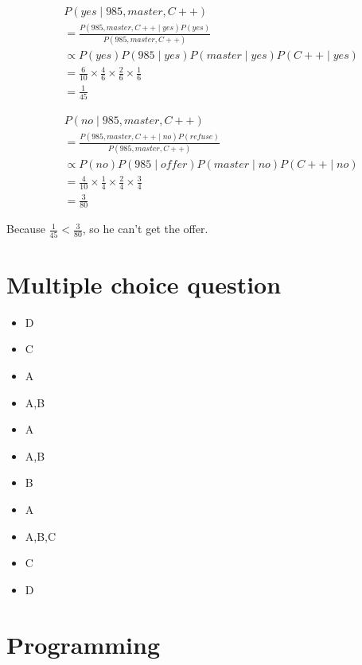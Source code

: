 \documentclass[letterpaper, 10 pt, conference]{ieeeconf}
\begin{document}
\begin{align*}
    & P(yes \mid 985,master,C++) \\
    & = \frac{P(985,master,C++ \mid yes)P(yes)}{P(985,master,C++)} \\
    & \propto P(yes)P(985 \mid yes)P(master \mid yes)P(C++ \mid yes) \\
    & = \frac{6}{10} \times \frac{4}{6} \times \frac{2}{6} \times \frac{1}{6} \\
    & = \frac{1}{45}
\end{align*}

\begin{align*}
    & P(no \mid 985,master,C++) \\
    & = \frac{P(985,master,C++ \mid no)P(refuse)}{P(985,master,C++)} \\
    & \propto P(no)P(985 \mid offer)P(master \mid no)P(C++ \mid no) \\
    & = \frac{4}{10} \times \frac{1}{4} \times \frac{2}{4} \times \frac{3}{4} \\
    & = \frac{3}{80}
\end{align*}

Because $\frac{1}{45} < \frac{3}{80}$, so he can't get the offer.

\section{Multiple choice question}

\begin{itemize}

\item D
\item C
\item A
\item A,B
\item A
\item A,B
\item B
\item A
\item A,B,C
\item C
\item D

\end{itemize}



\section{Programming}

\end{document}

